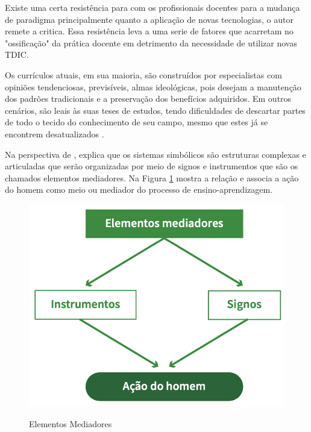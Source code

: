 Existe uma certa resistência para com os profissionais docentes para a mudança de paradigma principalmente quanto a aplicação de novas tecnologias, o autor  remete a critica. Essa resistência leva a uma serie de fatores que acarretam no "ossificação" da prática docente em detrimento da necessidade de utilizar novas TDIC.

Os currículos atuais, em sua maioria, são construídos por especialistas com opiniões tendenciosas, previsíveis, almas ideológicas, pois desejam a manutenção dos padrões tradicionais e a preservação dos benefícios adquiridos. Em outros cenários, são leais às suas teses de estudos, tendo dificuldades de descartar partes de todo o tecido do conhecimento de seu campo, mesmo que estes já se encontrem desatualizados \cite{fava2018trabalho}.

Na perspectiva de , explica que os sistemas simbólicos são estruturas complexas e articuladas que serão organizadas por meio de signos e instrumentos que são os chamados elementos mediadores. Na Figura \ref{fig:elementos_mediadores} mostra a relação e associa a ação do homem como meio ou mediador do processo de ensino-aprendizagem.

\begin{figure}[h!]
    \caption{Elementos Mediadores}
    \centering
    \includegraphics[scale=0.6]{figuras/elementos_mediadores.png}
    \label{fig:elementos_mediadores}
\end{figure}

